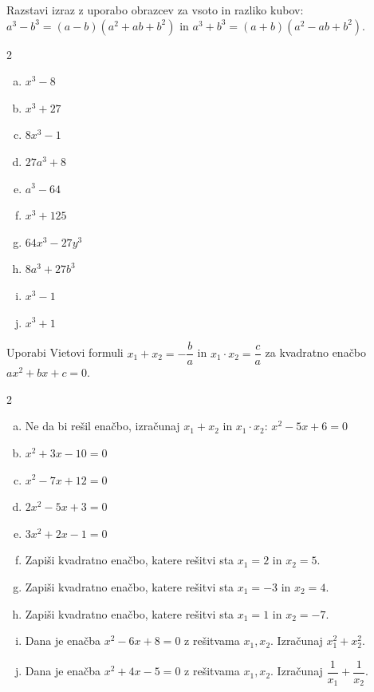 \documentclass[a4paper,12pt]{letter}
\begin{document}
\begin{naloga}
Razstavi izraz z uporabo obrazcev za vsoto in razliko kubov: $a^3-b^3=(a-b)(a^2+ab+b^2)$
in $a^3+b^3=(a+b)(a^2-ab+b^2)$.

\begin{multicols}{2}
\begin{enumerate}[a.)]
\item $x^3-8$
\item $x^3+27$
\item $8x^3-1$
\item $27a^3+8$
\item $a^3-64$
\item $x^3+125$
\item $64x^3-27y^3$
\item $8a^3+27b^3$
\item $x^3-1$
\item $x^3+1$
\end{enumerate}
\end{multicols}
\end{naloga}

\begin{naloga}
Uporabi Vietovi formuli $x_1+x_2=-\dfrac{b}{a}$ in $x_1\cdot x_2=\dfrac{c}{a}$ za kvadratno ena\v{c}bo $ax^2+bx+c=0$.

\begin{multicols}{2}
\begin{enumerate}[a.)]
\item Ne da bi re\v{s}il ena\v{c}bo, izra\v{c}unaj $x_1+x_2$ in $x_1\cdot x_2$: $x^2-5x+6=0$
\item $x^2+3x-10=0$
\item $x^2-7x+12=0$
\item $2x^2-5x+3=0$
\item $3x^2+2x-1=0$
\item Zapi\v{s}i kvadratno ena\v{c}bo, katere re\v{s}itvi sta $x_1=2$ in $x_2=5$.
\item Zapi\v{s}i kvadratno ena\v{c}bo, katere re\v{s}itvi sta $x_1=-3$ in $x_2=4$.
\item Zapi\v{s}i kvadratno ena\v{c}bo, katere re\v{s}itvi sta $x_1=1$ in $x_2=-7$.
\item Dana je ena\v{c}ba $x^2-6x+8=0$ z re\v{s}itvama $x_1,x_2$. Izra\v{c}unaj $x_1^2+x_2^2$.
\item Dana je ena\v{c}ba $x^2+4x-5=0$ z re\v{s}itvama $x_1,x_2$. Izra\v{c}unaj $\dfrac{1}{x_1}+\dfrac{1}{x_2}$.
\end{enumerate}
\end{multicols}
\end{naloga}
\end{document}
